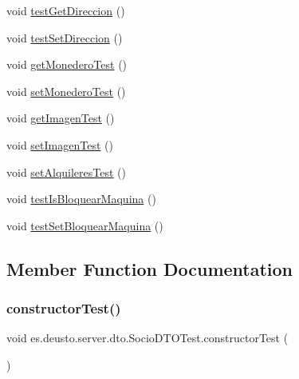 \begin{DoxyCompactItemize}
void \mbox{\hyperlink{classes_1_1deusto_1_1server_1_1dto_1_1_socio_d_t_o_test_a4d005783daf7e67291d4f431e977906f}{test\+Get\+Direccion}} ()
\item 
void \mbox{\hyperlink{classes_1_1deusto_1_1server_1_1dto_1_1_socio_d_t_o_test_aa2468d214152d12ea1ef9f8a03ed13a6}{test\+Set\+Direccion}} ()
\item 
void \mbox{\hyperlink{classes_1_1deusto_1_1server_1_1dto_1_1_socio_d_t_o_test_a486c18c0b56c9e329906565692c2fe82}{get\+Monedero\+Test}} ()
\item 
void \mbox{\hyperlink{classes_1_1deusto_1_1server_1_1dto_1_1_socio_d_t_o_test_aac35589c5e8f3dfc3ef66576d4516e16}{set\+Monedero\+Test}} ()
\item 
void \mbox{\hyperlink{classes_1_1deusto_1_1server_1_1dto_1_1_socio_d_t_o_test_a1c4cfecef678a6f28318285082e6c309}{get\+Imagen\+Test}} ()
\item 
void \mbox{\hyperlink{classes_1_1deusto_1_1server_1_1dto_1_1_socio_d_t_o_test_a4d76f427f8fe606311042fb4f3f6e833}{set\+Imagen\+Test}} ()
\item 
void \mbox{\hyperlink{classes_1_1deusto_1_1server_1_1dto_1_1_socio_d_t_o_test_a65d24014ab04a361dfb31a7d61b9dd81}{set\+Alquileres\+Test}} ()
\item 
void \mbox{\hyperlink{classes_1_1deusto_1_1server_1_1dto_1_1_socio_d_t_o_test_a7f5ac317df4e0732b1f57f3fca21c1a1}{test\+Is\+Bloquear\+Maquina}} ()
\item 
void \mbox{\hyperlink{classes_1_1deusto_1_1server_1_1dto_1_1_socio_d_t_o_test_aba938e062203fa65fb7c8dbf5c7e9f11}{test\+Set\+Bloquear\+Maquina}} ()
\end{DoxyCompactItemize}


\subsection{Member Function Documentation}
\mbox{\label{classes_1_1deusto_1_1server_1_1dto_1_1_socio_d_t_o_test_a44946d60fafb859e93ef9779e596df83}} 
\subsubsection{\texorpdfstring{constructorTest()}{constructorTest()}}
{\footnotesize\ttfamily void es.\+deusto.\+server.\+dto.\+Socio\+D\+T\+O\+Test.\+constructor\+Test (\begin{DoxyParamCaption}{ }\end{DoxyParamCaption})}

